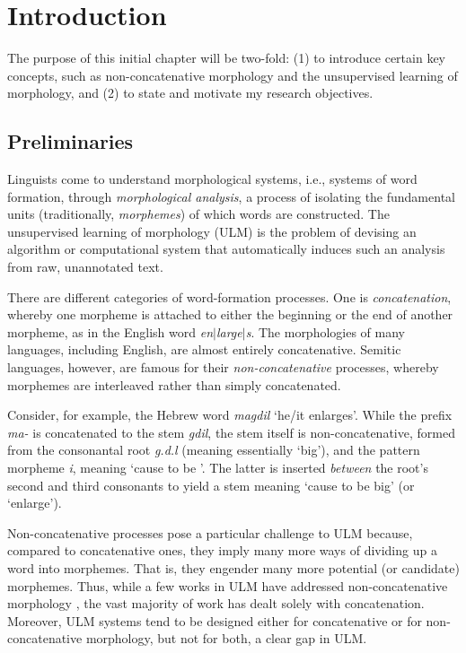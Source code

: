 \chapter{Introduction}\label{ch:intro}

The purpose of this initial chapter will be two-fold: (1) to 
introduce certain key concepts, such as non-concatenative morphology 
and the unsupervised learning of morphology, 
and (2) to state and motivate my research objectives. 

\section{Preliminaries} 
Linguists come to understand morphological 
systems, i.e., systems of word formation, through 
\emph{morphological analysis}, a process of isolating the fundamental units
(traditionally, \emph{morphemes}) of which words are constructed. 
The unsupervised learning of morphology (ULM) is the problem of devising an 
algorithm or computational system that
automatically induces such an analysis from raw, unannotated text.

There are different categories of word-formation processes.
One is \emph{concatenation}, whereby one morpheme is attached 
to either the beginning or the end of another morpheme, as in the 
English word \textit{en}$|$\textit{large}$|$\textit{s}. 
The morphologies of many languages, including English, 
are almost entirely concatenative. Semitic languages, however, are 
famous for their \emph{non-concatenative} processes, whereby 
morphemes are interleaved rather than simply concatenated.

Consider, for example, the Hebrew word 
\textit{magdil} `he/it enlarges'. While the prefix \textit{ma-} is 
concatenated to the stem \textit{gdil}, the stem itself is 
non-concatenative, formed from the consonantal root \textit{g.d.l} 
(meaning essentially `big'), and the pattern morpheme \textit{i}, meaning 
`cause to be \uline{\hspace{0.7cm}}'. The latter is inserted 
\textit{between} the root's second and third consonants 
to yield a stem meaning `cause to be big' (or `enlarge').

Non-concatenative processes pose a particular challenge to 
ULM because, 
compared to concatenative ones, 
they imply many more ways of dividing up a word into morphemes. 
That is, they engender many more potential (or candidate) morphemes.   
Thus, while a few works in ULM have addressed non-concatenative 
morphology 
\citep[e.g.,][]{rodrigues-and-cavar:2005, botha:blunsom:13}, 
the vast majority 
of work has dealt solely with concatenation.
Moreover, ULM systems tend 
to be designed either for concatenative or for non-concatenative morphology, 
but not for both, a clear gap in ULM.

